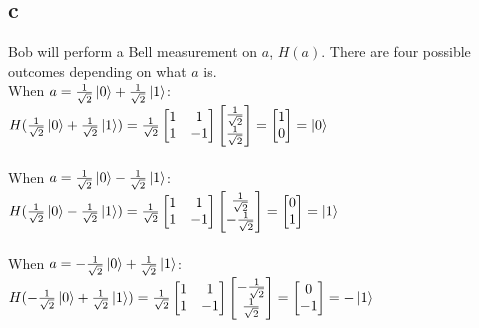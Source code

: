 \documentclass[letterpaper,notitlepage,twoside]{article}
\begin{document}
\subsection*{c}
Bob will perform a Bell measurement on $a$, $H(a)$. There are four possible outcomes depending on what $a$ is. \\
When $a = \frac{1}{\sqrt 2} \ket{0} + \frac{1}{\sqrt 2} \ket{1}$:\\
$H(\frac{1}{\sqrt 2} \ket{0} + \frac{1}{\sqrt 2} \ket{1}) = \frac{1}{\sqrt 2} \begin{bmatrix}1 & 1 \\ 1 & -1 \end{bmatrix}\begin{bmatrix} \frac{1}{\sqrt 2} \\ \frac{1}{\sqrt 2} \end{bmatrix} = \begin{bmatrix}1 \\ 0 \end{bmatrix} = \ket{0} $ \\ 
\\
When $a = \frac{1}{\sqrt 2} \ket{0} - \frac{1}{\sqrt 2} \ket{1}$:\\
$H(\frac{1}{\sqrt 2} \ket{0} - \frac{1}{\sqrt 2} \ket{1}) = \frac{1}{\sqrt 2} \begin{bmatrix}1 & 1 \\ 1 & -1 \end{bmatrix} \begin{bmatrix} \frac{1}{\sqrt 2} \\ -\frac{1}{\sqrt 2} \end{bmatrix} = \begin{bmatrix} 0 \\ 1\end{bmatrix} = \ket{1}$\\ 
\\
When $a = -\frac{1}{\sqrt 2} \ket{0} + \frac{1}{\sqrt 2} \ket{1}$:\\
$H(-\frac{1}{\sqrt 2} \ket{0} + \frac{1}{\sqrt 2} \ket{1}) = \frac{1}{\sqrt 2} \begin{bmatrix}1 & 1 \\ 1 & -1 \end{bmatrix} \begin{bmatrix}-\frac{1}{\sqrt 2} \\ \frac{1}{\sqrt 2} \end{bmatrix}= \begin{bmatrix}0 \\ -1 \end{bmatrix} = -\ket{1}$ \\ 
\end{document}
